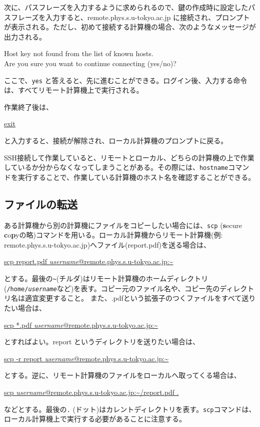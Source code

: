 次に、パスフレーズを入力するように求められるので、鍵の作成時に設定したパスフレーズを入力すると、remote.phys.s.u-tokyo.ac.jp に接続され、プロンプトが表示される。ただし、初めて接続する計算機の場合、次のようなメッセージが出力される。
\begin{commandline2}
Host key not found from the list of known hosts.\\
Are you sure you want to continue connecting (yes/no)?
\end{commandline2} \noindent
ここで、{\tt yes} と答えると、先に進むことができる。ログイン後、入力する命令は、すべてリモート計算機上で実行される。

作業終了後は、
\begin{commandline2}
\prompt \underline{exit}
\end{commandline2} \noindent
と入力すると、接続が解除され、ローカル計算機のプロンプトに戻る。

SSH接続して作業していると、リモートとローカル、どちらの計算機の上で作業しているか分からなくなってしまうことがある。その際には、{\tt hostname}コマンドを実行することで、作業している計算機のホスト名を確認することができる。

\subsection{ファイルの転送}

ある計算機から別の計算機にファイルをコピーしたい場合には、{\tt scp} ({\bf s}ecure {\bf c}o{\bf p}yの略)コマンドを用いる。ローカル計算機からリモート計算機(例: remote.phys.s.u-tokyo.ac.jp)へファイル(report.pdf)を送る場合は、
\begin{commandline2}
\prompt \underline{scp report.pdf {\it username}@remote.phys.s.u-tokyo.ac.jp:\~{} }
\end{commandline2} \noindent
とする。最後の{\tt \~{}}(チルダ)はリモート計算機のホームディレクトリ({\tt /home/{\it username}}など)を表す。コピー元のファイル名や、コピー先のディレクトリ名は適宜変更すること。
また、.pdfという拡張子のつくファイルをすべて送りたい場合は、
\begin{commandline2}
\prompt \underline{scp *.pdf {\it username}@remote.phys.s.u-tokyo.ac.jp:\~{} }
\end{commandline2} \noindent
とすればよい。report というディレクトリを送りたい場合は、
\begin{commandline2}
\prompt \underline{scp -r report {\it username}@remote.phys.s.u-tokyo.ac.jp:\~{}}
\end{commandline2} \noindent
とする。逆に、リモート計算機のファイルをローカルへ取ってくる場合は、
\begin{commandline2}
\prompt \underline{scp {\it username}@remote.phys.s.u-tokyo.ac.jp:\~{}/report.pdf .}
\end{commandline2} \noindent
などとする。最後の{\tt .} (ドット)はカレントディレクトリを表す。{\tt scp}コマンドは、ローカル計算機上で実行する必要があることに注意する。

